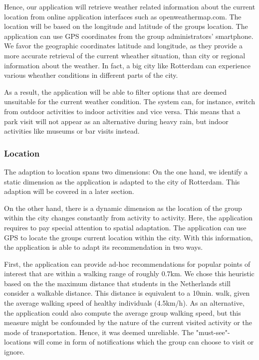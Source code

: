 \documentclass[11pt,a4paper,oneside]{article}
\begin{document}
Hence, our application will retrieve weather related information about the current location from online application interfaces such as openweathermap.com. The location will be based on the longitude and latitude of the groups location. The application can use GPS coordinates from the group administrators' smartphone. We favor the geographic coordinates latitude and longitude, as they provide a more accurate retrieval of the current wheather situation, than city or regional information about the weather. In fact, a big city like Rotterdam can experience various wheather conditions in different parts of the city. 

As a result, the application will be able to filter options that are deemed unsuitable for the current weather condition. The system can, for instance, switch from outdoor activities to indoor activities and vice versa.\cite{creemers2015meteorological} This means that a park visit will not appear as an alternative during heavy rain, but indoor activities like museums or bar visits instead.

\subsubsection{Location}
The adaption to location spans two dimensions: On the one hand, we identify a static dimension as the application is adapted to the city of Rotterdam. This adaption will be covered in a later section. 

On the other hand, there is a dynamic dimension as the location of the group within the city changes constantly from activity to activity. Here, the application requires to pay special attention to spatial adaptation. The application can use GPS to locate the groups current location within the city. With this information, the application is able to adapt its recommendation in two ways. 

First, the application can provide ad-hoc recommendations for popular points of interest that are within a walking range of roughly 0.7km. We chose this heuristic based on the the maximum distance that students in the Netherlands still consider a walkable distance.\cite{ton_CyclingWalkingDeterminants_2019} This distance is equivalent to a 10min. walk, given the average walking speed of healthy individuals (4.5km/h).\cite{schimpl_AssociationWalkingSpeed_2011} As an alternative, the application could also compute the average group walking speed, but this measure might be confounded by the nature of the current visited activity or the mode of transportation. Hence, it was deemed unreliable. The "must-see"-locations will come in form of notifications which the group can choose to visit or ignore. 
\end{document}
